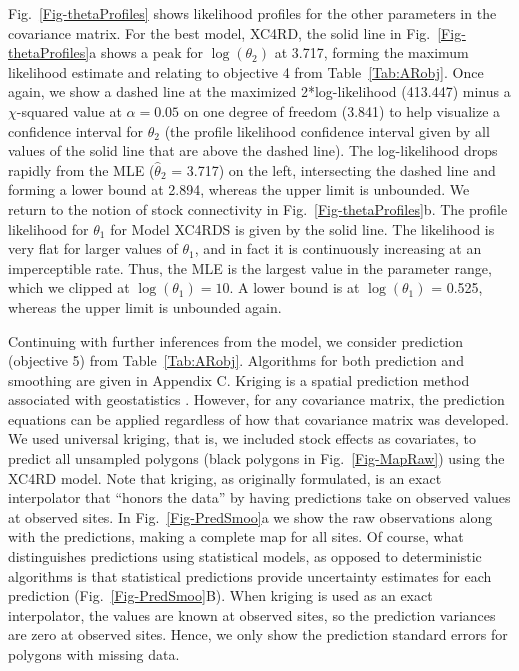Fig.~\ref{Fig-thetaProfiles} shows likelihood profiles for the other parameters in the covariance matrix.  For the best model, XC4RD, the solid line in Fig.~\ref{Fig-thetaProfiles}a shows a peak for $\log(\theta_2)$ at 3.717, forming the maximum likelihood estimate and relating to objective 4 from Table~\ref{Tab:ARobj}. Once again, we show a dashed line at the maximized 2*log-likelihood (413.447) minus a $\chi$-squared value at $\alpha = 0.05$ on one degree of freedom (3.841) to help visualize a confidence interval for $\theta_2$ (the profile likelihood confidence interval given by all values of the solid line that are above the dashed line). The log-likelihood drops rapidly from the MLE ($\hat{\theta}_2$ = 3.717) on the left, intersecting the dashed line and forming a lower bound at 2.894, whereas the upper limit is unbounded. We return to the notion of stock connectivity in Fig.~\ref{Fig-thetaProfiles}b.  The profile likelihood for $\theta_1$ for Model XC4RDS is given by the solid line. The likelihood is very flat for larger values of $\theta_1$, and in fact it is continuously increasing at an imperceptible rate. Thus, the MLE is the largest value in the parameter range, which we clipped at $\log(\theta_1) = 10$. A lower bound is at $\log(\theta_1)$ = 0.525, whereas the upper limit is unbounded again.

Continuing with further inferences from the model, we consider prediction (objective 5) from Table~\ref{Tab:ARobj}. Algorithms for both prediction and smoothing are given in Appendix C.  Kriging is a spatial prediction method associated with geostatistics \citep{Cres:orig:1990}.  However, for any covariance matrix, the prediction equations can be applied regardless of how that covariance matrix was developed.  We used universal kriging, that is, we included stock effects as covariates, \citep[][pg. 151]{Huij:Math:univ:1971,Cres:stat:1993} to predict all unsampled polygons (black polygons in Fig.~\ref{Fig-MapRaw}) using the XC4RD model. Note that kriging, as originally formulated, is an exact interpolator \citep[pg. 129]{Cres:stat:1993} that ``honors the data'' \citep[p. 252]{Scha:Gotw:stat:2005} by having predictions take on observed values at observed sites.  In Fig.~\ref{Fig-PredSmoo}a we show the raw observations along with the predictions, making a complete map for all sites. Of course, what distinguishes predictions using statistical models, as opposed to deterministic algorithms \citep[e.g., inverse distance weighted,][]{Shep:two:1968} is that statistical predictions provide uncertainty estimates for each prediction (Fig.~\ref{Fig-PredSmoo}B).  When kriging is used as an exact interpolator, the values are known at observed sites, so the prediction variances are zero at observed sites.  Hence, we only show the prediction standard errors for polygons with missing data.  

